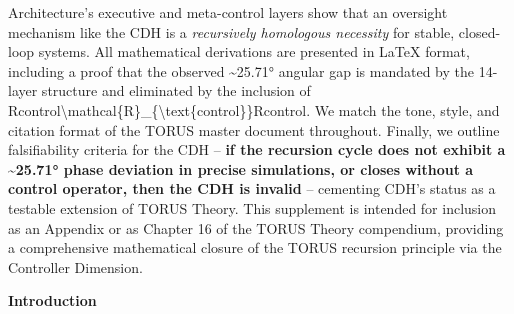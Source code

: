\documentclass[
]{article}
\begin{document}
Architecture's executive and meta-control layers show that an oversight
mechanism like the CDH is a \emph{recursively homologous necessity} for
stable, closed-loop systems\hspace{0pt}. All mathematical derivations
are presented in LaTeX format, including a proof that the observed
\textasciitilde25.71° angular gap is mandated by the 14-layer structure
and eliminated by the inclusion of
Rcontrol\textbackslash mathcal\{R\}\_\{\textbackslash text\{control\}\}Rcontrol\hspace{0pt}.
We match the tone, style, and citation format of the TORUS master
document throughout. Finally, we outline falsifiability criteria for the
CDH -- \textbf{if the recursion cycle does not exhibit a
\textasciitilde25.71° phase deviation in precise simulations, or closes
without a control operator, then the CDH is invalid} -- cementing CDH's
status as a testable extension of TORUS Theory. This supplement is
intended for inclusion as an Appendix or as Chapter 16 of the TORUS
Theory compendium, providing a comprehensive mathematical closure of the
TORUS recursion principle via the Controller Dimension.

\textbf{Introduction}
\end{document}
